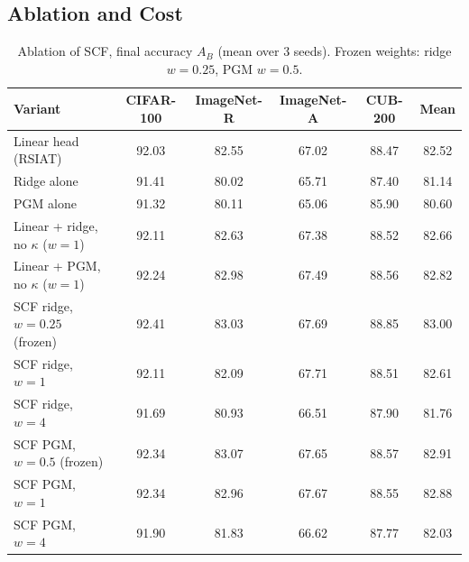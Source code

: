 \subsection{Ablation and Cost}\label{sec:ablation}
\begin{table}[t]
\centering
\caption{Ablation of SCF, final accuracy $A_B$ (mean over 3 seeds). Frozen weights: ridge $w=0.25$,
PGM $w=0.5$. }
\label{tab:ablation}
\small
\begin{tabular}{lccccc}
\toprule
Variant & CIFAR-100 & ImageNet-R & ImageNet-A & CUB-200 & Mean \\
\midrule
Linear head (RSIAT) & 92.03 & 82.55 & 67.02 & 88.47 & 82.52 \\
Ridge alone & 91.41 & 80.02 & 65.71 & 87.40 & 81.14 \\
PGM alone & 91.32 & 80.11 & 65.06 & 85.90 & 80.60 \\
\midrule
Linear + ridge, no $\kappa$ ($w=1$) & 92.11 & 82.63 & 67.38 & 88.52 & 82.66 \\
Linear + PGM, no $\kappa$ ($w=1$) & 92.24 & 82.98 & 67.49 & 88.56 & 82.82 \\
\midrule
SCF ridge, $w=0.25$ (frozen) & 92.41 & 83.03 & 67.69 & 88.85 & 83.00 \\
SCF ridge, $w=1$ & 92.11 & 82.09 & 67.71 & 88.51 & 82.61 \\
SCF ridge, $w=4$ & 91.69 & 80.93 & 66.51 & 87.90 & 81.76 \\
SCF PGM, $w=0.5$ (frozen) & 92.34 & 83.07 & 67.65 & 88.57 & 82.91 \\
SCF PGM, $w=1$ & 92.34 & 82.96 & 67.67 & 88.55 & 82.88 \\
SCF PGM, $w=4$ & 91.90 & 81.83 & 66.62 & 87.77 & 82.03 \\
\bottomrule
\end{tabular}
\end{table}


